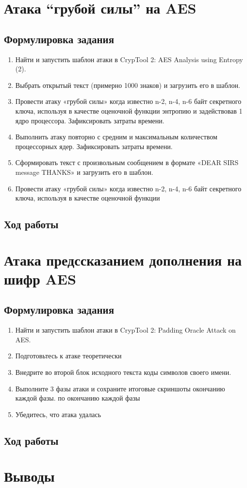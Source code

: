 \documentclass[a4paper, 14pt]{extarticle}
\begin{document}
\section{Атака \enquote{грубой силы} на AES}
\subsection{Формулировка задания}
\begin{enumerate}
    \item Найти и запустить шаблон атаки в CrypTool 2: AES Analysis using Entropy (2).
    \item  Выбрать открытый текст (примерно 1000 знаков) и загрузить его в шаблон.
    \item  Провести атаку «грубой силы» когда известно n-2, n-4, n-6 байт секретного ключа, используя в качестве оценочной функции энтропию и задействовав 1 ядро процессора. Зафиксировать затраты времени.
    \item  Выполнить атаку повторно с средним и максимальным количеством процессорных ядер. Зафиксировать затраты времени.
    \item  Сформировать текст с произвольным сообщением в формате «DEAR SIRS message THANKS» и загрузить его в шаблон. 
    \item  Провести атаку «грубой силы» когда известно n-2, n-4, n-6 байт секретного ключа, используя в качестве оценочной функции
\end{enumerate}

\subsection{Ход работы}
\lipsum[1] %

\section{Атака предссказанием дополнения на шифр AES}
\subsection{Формулировка задания}
\begin{enumerate}
    \item Найти и запустить шаблон атаки в CrypTool 2: Padding Oracle Attack on AES.\@
    \item Подготовьтесь к атаке теоретически
    \item  Внедрите во второй блок исходного текста коды символов своего имени.
    \item  Выполните 3 фазы атаки и сохраните итоговые скриншоты окончанию каждой фазы.  по окончанию каждой фазы
    \item Убедитесь, что атака удалась
\end{enumerate}

\subsection{Ход работы}
\lipsum[1] %

\section*{Выводы}
\lipsum[1] %
\end{document}
